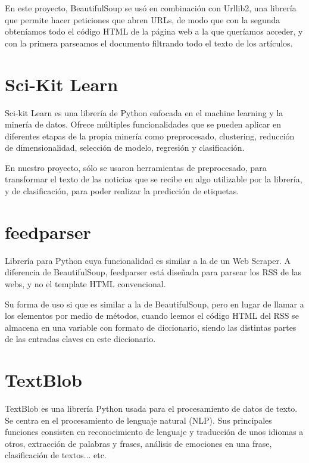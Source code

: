 En este proyecto, BeautifulSoup se usó en combinación con Urllib2, una librería que permite hacer peticiones que abren URLs, de modo que con la segunda obteníamos todo el código HTML de la página web a la que queríamos acceder, y con la primera parseamos el documento filtrando todo el texto de los artículos.


\section{Sci-Kit Learn}

Sci-kit Learn \cite{pedregosa2011scikit} \cite{scikitlearn} es una librería de Python enfocada en el machine learning y la minería de datos. Ofrece múltiples funcionalidades que se pueden aplicar en diferentes etapas de la propia minería como preprocesado, clustering, reducción de dimensionalidad, selección de modelo, regresión y clasificación.

En nuestro proyecto, sólo se usaron herramientas de preprocesado, para transformar el texto de las noticias que se recibe en algo utilizable por la librería, y de clasificación, para poder realizar la predicción de etiquetas.


\section{feedparser}

Librería para Python cuya funcionalidad es similar a la de un Web Scraper. A diferencia de BeautifulSoup, feedparser \cite{feedparser} está diseñada para parsear los RSS de las webs, y no el template HTML convencional. 

Su forma de uso si que es similar a la de BeautifulSoup, pero en lugar de llamar a los elementos por medio de métodos, cuando leemos el código HTML del RSS se almacena en una variable con formato de diccionario, siendo las distintas partes de las entradas claves en este diccionario.


\section{TextBlob}

TextBlob \cite{loria2014textblob} es una librería Python usada para el procesamiento de datos de texto. Se centra en el procesamiento de lenguaje natural (NLP). Sus principales funciones consisten en reconocimiento de lenguaje y traducción de unos idiomas a otros, extracción de palabras y frases, análisis de emociones en una frase, clasificación de textos... etc.

